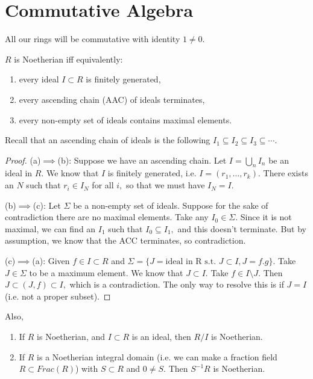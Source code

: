 \documentclass{article}
\numberwithin{equation}{section}
\begin{document}
\section{Commutative Algebra}
All our rings will be commutative with identity $1\neq 0.$
\begin{proposition}
    $R$ is Noetherian iff equivalently:
    \begin{enumerate}[label=(\alph*)]
        \item every ideal $I \subset R$ is finitely generated,
        \item every ascending chain (AAC) of ideals terminates,
        \item every non-empty set of ideals contains maximal elements.
    \end{enumerate}
\end{proposition}
Recall that an ascending chain of ideals is the following $I_1 \subseteq I_2 \subseteq I_3 \subseteq \cdots.$
\begin{proof}
    (a)$\implies$(b): Suppose we have an ascending chain. Let $I= \bigcup_n I_n$ be an ideal in $R.$ We know that $I$ is finitely generated, i.e. $I=(r_1,\dots, r_k).$ There exists an $N$ such that $r_i \in I_N$ for all $i,$ so that we must have $I_N=I.$
    \vspace{2mm}

    (b)$\implies$(c): Let $\Sigma$ be a non-empty set of ideals. Suppose for the sake of contradiction there are no maximal elements. Take any $I_0\in \Sigma.$ Since it is not maximal, we can find an $I_1$ such that $I_0 \subseteq I_1,$ and this doesn't terminate. But by assumption, we know that the ACC terminates, so contradiction.
    \vspace{2mm}

    (c)$\implies$(a): Given $f\in I \subset R$ and $\Sigma = \{J=\text{ideal in R s.t. }J\subset I,J=f.g\}.$ Take $J\in \Sigma$ to be a maximum element. We know that $J\subset I.$  Take $f\in I \setminus J.$ Then $J \subset (J,f) \subset I,$ which is a contradiction. The only way to resolve this is if $J=I$ (i.e. not a proper subset).
\end{proof}
Also,
\begin{proposition}
    \begin{enumerate}[label=(\roman*)]
        \item If $R$ is Noetherian, and $I\subset R$ is an ideal, then $R/I$ is Noetherian.
        \item If $R$ is a Noetherian integral domain (i.e. we can make a fraction field $R\subset Frac(R)$) with $S\subset R$ and $0\neq S.$ Then $S^{-1}R$ is Noetherian. 
    \end{enumerate}
\end{proposition}
\end{document}
